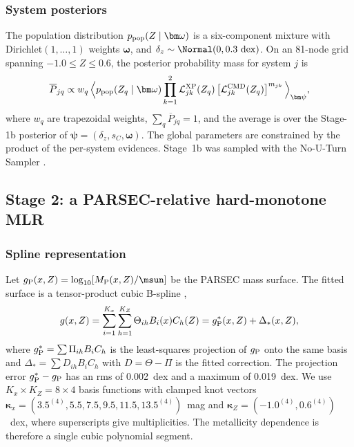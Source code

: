 \subsubsection{System posteriors}

The population distribution $p_{\rm pop}(Z\mid\bm\omega)$ is a six-component
mixture with Dirichlet$(1,\ldots,1)$ weights $\bm\omega$, and
$\delta_z\sim\Normal(0,0.3~{\rm dex})$.  On an 81-node grid spanning
$-1.0\le Z\le0.6$, the posterior probability mass for system $j$ is
\begin{equation}
 \overline P_{jq}\propto w_q\,
 \Big\langle p_{\rm pop}(Z_q\mid\bm\omega)
 \prod_{k=1}^{2}\mathcal{L}^{\rm XP}_{jk}(Z_q)
 \left[\mathcal{L}^{\rm CMD}_{jk}(Z_q)\right]^{m_{jk}}
 \Big\rangle_{\bm\psi},
 \label{eq:zpost}
\end{equation}
where $w_q$ are trapezoidal weights, $\sum_q\overline P_{jq}=1$, and the
average is over the Stage-1b posterior of $\bm\psi=(\delta_z,s_C,\bm\omega)$.
The global parameters are constrained by the product of the per-system
evidences.  Stage~1b was sampled with the No-U-Turn Sampler
\citep[NUTS;][]{HoffmanGelman2014NUTS} .

\subsection{Stage 2: a PARSEC-relative hard-monotone MLR}
\label{sec:mlr}

\subsubsection{Spline representation}

Let $g_{\rm P}(x,Z)=\log_{10}[M_{\rm P}(x,Z)/\msun]$ be the PARSEC mass
surface.  The fitted surface is a tensor-product cubic B-spline
\citep{deBoor2001Splines},
\begin{equation}
 g(x,Z)=\sum_{i=1}^{K_x}\sum_{h=1}^{K_Z}\Theta_{ih}B_i(x)C_h(Z)
       =g_{\rm P}^{*}(x,Z)+\Delta_*(x,Z),
 \label{eq:g-total}
\end{equation}
where $g_{\rm P}^*=\sum\Pi_{ih}B_iC_h$ is the least-squares projection of
$g_{\rm P}$ onto the same basis and $\Delta_*=\sum D_{ih}B_iC_h$ with
$D=\Theta-\Pi$ is the fitted correction.  The projection error
$g_{\rm P}^*-g_{\rm P}$ has an rms of 0.002~dex and a maximum of 0.019~dex.
We use $K_x\times K_Z=8\times4$ basis functions with clamped knot vectors
$\bm\kappa_x=(3.5^{(4)},5.5,7.5,9.5,11.5,13.5^{(4)})$~mag and
$\bm\kappa_Z=(-1.0^{(4)},0.6^{(4)})$~dex, where superscripts give
multiplicities.  The metallicity dependence is therefore a single cubic
polynomial segment.

